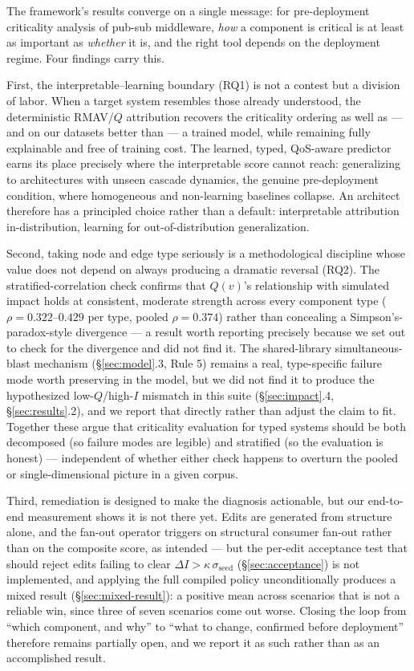\documentclass[review]{elsarticle}
\begin{document}
The framework's results converge on a single message: for pre-deployment criticality analysis of
pub-sub middleware, \emph{how} a component is critical is at least as important as \emph{whether} it
is, and the right tool depends on the deployment regime. Four findings carry this.

First, the interpretable--learning boundary (RQ1) is not a contest but a division of labor. When a
target system resembles those already understood, the deterministic RMAV/$Q$ attribution recovers
the criticality ordering as well as --- and on our datasets better than --- a trained model, while
remaining fully explainable and free of training cost. The learned, typed, QoS-aware predictor earns
its place precisely where the interpretable score cannot reach: generalizing to architectures with
unseen cascade dynamics, the genuine pre-deployment condition, where homogeneous and non-learning
baselines collapse. An architect therefore has a principled choice rather than a default:
interpretable attribution in-distribution, learning for out-of-distribution generalization.

Second, taking node and edge type seriously is a methodological discipline whose value does not
depend on always producing a dramatic reversal (RQ2). The stratified-correlation check confirms that
$Q(v)$'s relationship with simulated impact holds at consistent, moderate strength across every
component type ($\rho = 0.322$--$0.429$ per type, pooled $\rho = 0.374$) rather than concealing a
Simpson's-paradox-style divergence --- a result worth reporting precisely because we set out to check
for the divergence and did not find it. The shared-library simultaneous-blast mechanism
(\S\ref{sec:model}.3, Rule 5) remains a real, type-specific failure mode worth preserving in the
model, but we did not find it to produce the hypothesized low-$Q$/high-$I$ mismatch in this suite
(\S\ref{sec:impact}.4, \S\ref{sec:results}.2), and we report that directly rather than adjust the
claim to fit. Together these argue that criticality evaluation for typed systems should be both
decomposed (so failure modes are legible) and stratified (so the evaluation is honest) ---
independent of whether either check happens to overturn the pooled or single-dimensional picture in
a given corpus.

Third, remediation is designed to make the diagnosis actionable, but our end-to-end measurement
shows it is not there yet. Edits are generated from structure alone, and the fan-out operator
triggers on structural consumer fan-out rather than on the composite score, as intended --- but the
per-edit acceptance test that should reject edits failing to clear $\Delta I >
\kappa\,\sigma_{\text{seed}}$ (\S\ref{sec:acceptance}) is not implemented, and applying the full
compiled policy unconditionally produces a mixed result (\S\ref{sec:mixed-result}): a positive mean
across scenarios that is not a reliable win, since three of seven scenarios come out worse. Closing
the loop from ``which component, and why'' to ``what to change, confirmed before deployment''
therefore remains partially open, and we report it as such rather than as an accomplished result.
\end{document}
